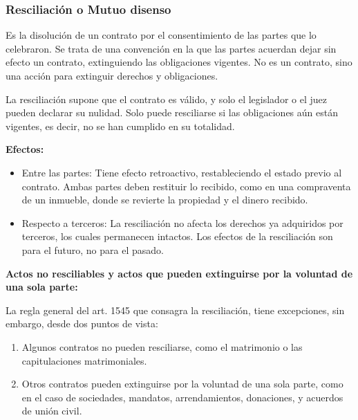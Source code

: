 \documentclass{templateNote}
\begin{document}
\subsubsection{Resciliación o Mutuo disenso}
Es la disolución de un contrato por el consentimiento de las partes que lo celebraron. Se trata de una convención en la que las partes acuerdan dejar sin efecto un contrato, extinguiendo las obligaciones vigentes. No es un contrato, sino una acción para extinguir derechos y obligaciones.

La resciliación supone que el contrato es válido, y solo el legislador o el juez pueden declarar su nulidad. Solo puede resciliarse si las obligaciones aún están vigentes, es decir, no se han cumplido en su totalidad.

\noindent \textbf{Efectos:}

\begin{itemize}
    \item Entre las partes: Tiene efecto retroactivo, restableciendo el estado previo al contrato. Ambas partes deben restituir lo recibido, como en una compraventa de un inmueble, donde se revierte la propiedad y el dinero recibido.
    \item Respecto a terceros: La resciliación no afecta los derechos ya adquiridos por terceros, los cuales permanecen intactos. Los efectos de la resciliación son para el futuro, no para el pasado.
\end{itemize}

\noindent\textbf{Actos no resciliables y actos que pueden extinguirse por la voluntad de una sola parte:}

La regla general del art. 1545 que consagra la resciliación, tiene excepciones, sin embargo, desde dos puntos de vista: 

\begin{enumerate}[label=\alph*)]
    \item Algunos contratos no pueden resciliarse, como el matrimonio o las capitulaciones matrimoniales.
    \item Otros contratos pueden extinguirse por la voluntad de una sola parte, como en el caso de sociedades, mandatos, arrendamientos, donaciones, y acuerdos de unión civil.
\end{enumerate}
\end{document}
